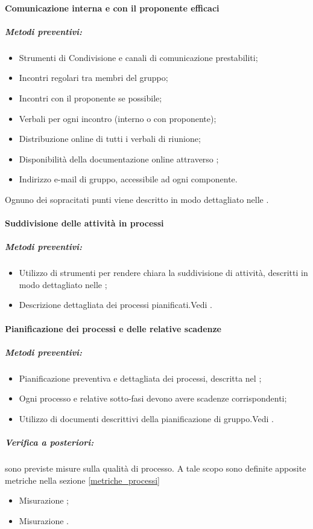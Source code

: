 \documentclass[12pt,a4paper]{article}
\begin{document}
\paragraph{Comunicazione interna e con il proponente efficaci}
\subparagraph{Metodi preventivi:}
\begin{itemize}
	\item Strumenti di Condivisione e canali di comunicazione prestabiliti;
	\item Incontri regolari tra membri del gruppo;
	\item Incontri con il proponente se possibile;
	\item Verbali per ogni incontro (interno o con proponente);
	\item Distribuzione online di tutti i verbali di riunione;
	\item Disponibilità della documentazione online attraverso ;
	\item Indirizzo e-mail di gruppo, accessibile ad ogni componente.
\end{itemize}
Ognuno dei sopracitati punti viene descritto in modo dettagliato nelle \NdP{}.

\paragraph{Suddivisione delle attività in processi}
\subparagraph{Metodi preventivi:}
\begin{itemize}
	\item Utilizzo di strumenti per rendere chiara la suddivisione di attività, descritti in modo dettagliato nelle \NdP{};
	\item Descrizione dettagliata dei processi pianificati.Vedi \PdP{}.
\end{itemize}

\paragraph{Pianificazione dei processi e delle relative scadenze}
\subparagraph{Metodi preventivi:}
\begin{itemize}
	\item Pianificazione preventiva e dettagliata dei processi, descritta nel \PdP{};
	\item Ogni processo e relative sotto-fasi devono avere scadenze corrispondenti;
	\item Utilizzo di documenti descrittivi della pianificazione di gruppo.Vedi \PdP{}.
\end{itemize}
\subparagraph{Verifica a posteriori:} sono previste misure sulla qualità di processo. A tale scopo sono definite apposite metriche nella sezione \ref{metriche_processi}
\begin{itemize}
	\item Misurazione ;
	\item Misurazione .
\end{itemize}
\end{document}

